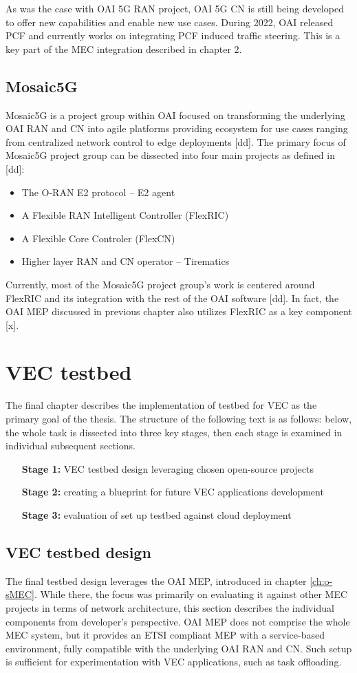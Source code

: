 \documentclass[12pt,a4paper,twoside]{report}
\begin{document}
As was the case with OAI 5G RAN project, OAI 5G CN is still being developed to offer new capabilities and enable new use cases. During 2022, OAI released PCF and currently works on integrating PCF induced traffic steering. This is a key part of the MEC integration described in chapter 2.
\section{Mosaic5G}
Mosaic5G is a project group within OAI focused on transforming the underlying OAI RAN and CN into agile platforms providing ecosystem for use cases ranging from centralized network control to edge deployments [dd]. The primary focus of Mosaic5G project group can be dissected into four main projects as defined in [dd]:
\begin{itemize}
	\item The O-RAN E2 protocol – E2 agent
	\item A Flexible RAN Intelligent Controller (FlexRIC)
	\item A Flexible Core Controler (FlexCN)
	\item Higher layer RAN and CN operator – Tirematics
\end{itemize}
Currently, most of the Mosaic5G project group’s work is centered around FlexRIC and its integration with the rest of the OAI software [dd]. In fact, the OAI MEP discussed in previous chapter also utilizes FlexRIC as a key component [x]. 
\chapter{VEC testbed}
The final chapter describes the implementation of testbed for VEC as the primary goal of the thesis. The structure of the following text is as follows: below, the whole task is dissected into three key stages, then each stage is examined in individual subsequent sections.
\begin{itemize}
	\item[\textbf{Stage 1:}] VEC testbed design leveraging chosen open-source projects 
	\item[\textbf{Stage 2:}] creating a blueprint for future VEC applications development
	\item[\textbf{Stage 3:}]  evaluation of set up testbed against cloud deployment
\end{itemize}

\section{VEC testbed design}
The final testbed design leverages the OAI MEP, introduced in chapter \ref{ch:o-sMEC}. While there, the focus was primarily on evaluating it against other MEC projects in terms of network architecture, this section describes the individual components from developer’s perspective. OAI MEP does not comprise the whole MEC system, but it provides an ETSI compliant MEP with a service-based environment, fully compatible with the underlying OAI RAN and CN. Such setup is sufficient for experimentation with VEC applications, such as task offloading. 
\end{document}
